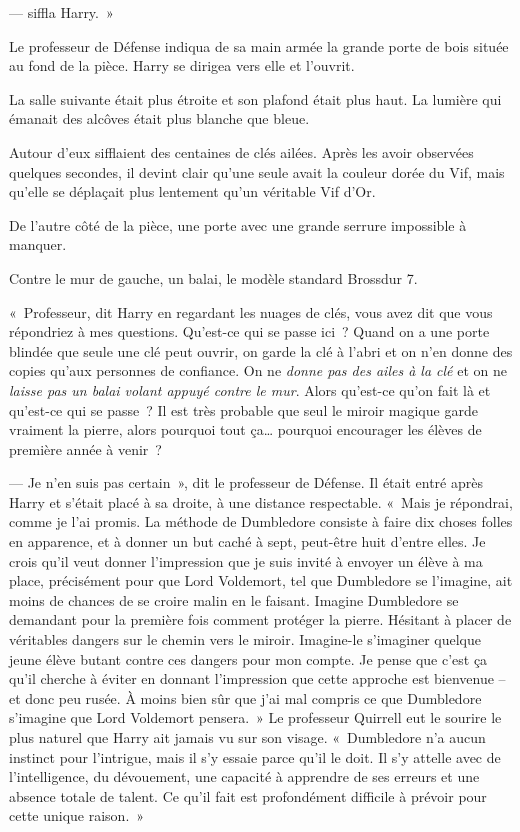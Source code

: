 ---  siffla Harry.~»

Le professeur de Défense indiqua de sa main armée la grande porte de bois située au fond de la pièce.
Harry se dirigea vers elle et l'ouvrit.

\later

La salle suivante était plus étroite et son plafond était plus haut.
La lumière qui émanait des alcôves était plus blanche que bleue.

Autour d'eux sifflaient des centaines de clés ailées.
Après les avoir observées quelques secondes, il devint clair qu'une seule avait la couleur dorée du Vif, mais qu'elle se déplaçait plus lentement qu'un véritable Vif d'Or.

De l'autre côté de la pièce, une porte avec une grande serrure impossible à manquer.

Contre le mur de gauche, un balai, le modèle standard Brossdur 7.

«~Professeur, dit Harry en regardant les nuages de clés, vous avez dit que vous répondriez à mes questions.
Qu'est-ce qui se passe ici~?
Quand on a une porte blindée que seule une clé peut ouvrir, on garde la clé à l'abri et on n'en donne des copies qu'aux personnes de confiance.
On ne \emph{donne pas des ailes à la clé} et on ne \emph{laisse pas un balai volant appuyé contre le mur}.
Alors qu'est-ce qu'on fait là et qu'est-ce qui se passe~?
Il est très probable que seul le miroir magique garde vraiment la pierre, alors pourquoi tout ça… pourquoi encourager les élèves de première année à venir~?

--- Je n'en suis pas certain~», dit le professeur de Défense.
Il était entré après Harry et s'était placé à sa droite, à une distance respectable.
«~Mais je répondrai, comme je l'ai promis.
La méthode de Dumbledore consiste à faire dix choses folles en apparence, et à donner un but caché à sept, peut-être huit d'entre elles.
Je crois qu'il veut donner l'impression que je suis invité à envoyer un élève à ma place, précisément pour que Lord Voldemort, tel que Dumbledore se l'imagine, ait moins de chances de se croire malin en le faisant.
Imagine Dumbledore se demandant pour la première fois comment protéger la pierre.
Hésitant à placer de véritables dangers sur le chemin vers le miroir.
Imagine-le s'imaginer quelque jeune élève butant contre ces dangers pour mon compte.
Je pense que c'est ça qu'il cherche à éviter en donnant l'impression que cette approche est bienvenue -- et donc peu rusée.
À moins bien sûr que j'ai mal compris ce que Dumbledore s'imagine que Lord Voldemort pensera.~»
Le professeur Quirrell eut le sourire le plus naturel que Harry ait jamais vu sur son visage.
«~Dumbledore n'a aucun instinct pour l'intrigue, mais il s'y essaie parce qu'il le doit.
Il s'y attelle avec de l'intelligence, du dévouement, une capacité à apprendre de ses erreurs et une absence totale de talent.
Ce qu'il fait est profondément difficile à prévoir pour cette unique raison.~»

